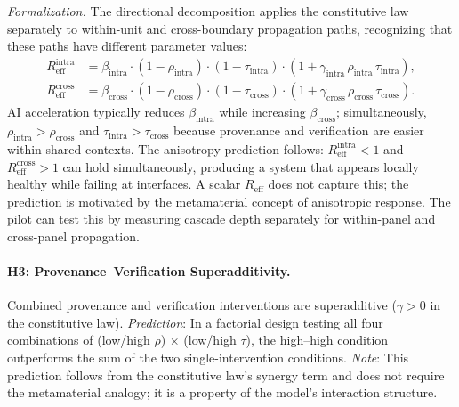 \documentclass[runningheads]{llncs}
\begin{document}
\emph{Formalization.} The directional decomposition applies the constitutive law separately to within-unit and cross-boundary propagation paths, recognizing that these paths have different parameter values:
\begin{align}
R_{\mathrm{eff}}^{\mathrm{intra}} &= \beta_{\mathrm{intra}} \cdot (1-\rho_{\mathrm{intra}}) \cdot (1-\tau_{\mathrm{intra}}) \cdot (1+\gamma_{\mathrm{intra}}\, \rho_{\mathrm{intra}}\, \tau_{\mathrm{intra}}), \label{eq:rintra} \\
R_{\mathrm{eff}}^{\mathrm{cross}} &= \beta_{\mathrm{cross}} \cdot (1-\rho_{\mathrm{cross}}) \cdot (1-\tau_{\mathrm{cross}}) \cdot (1+\gamma_{\mathrm{cross}}\, \rho_{\mathrm{cross}}\, \tau_{\mathrm{cross}}). \label{eq:rcross}
\end{align}
AI acceleration typically reduces $\beta_{\mathrm{intra}}$ while increasing $\beta_{\mathrm{cross}}$; simultaneously, $\rho_{\mathrm{intra}} > \rho_{\mathrm{cross}}$ and $\tau_{\mathrm{intra}} > \tau_{\mathrm{cross}}$ because provenance and verification are easier within shared contexts. The anisotropy prediction follows: $R_{\mathrm{eff}}^{\mathrm{intra}} < 1$ and $R_{\mathrm{eff}}^{\mathrm{cross}} > 1$ can hold simultaneously, producing a system that appears locally healthy while failing at interfaces. A scalar $R_{\mathrm{eff}}$ does not capture this; the prediction is motivated by the metamaterial concept of anisotropic response. The pilot can test this by measuring cascade depth separately for within-panel and cross-panel propagation.

\paragraph{H3: Provenance--Verification Superadditivity.}
Combined provenance and verification interventions are superadditive ($\gamma > 0$ in the constitutive law). \emph{Prediction}: In a factorial design testing all four combinations of (low/high $\rho$) $\times$ (low/high $\tau$), the high--high condition outperforms the sum of the two single-intervention conditions. \emph{Note}: This prediction follows from the constitutive law's synergy term and does not require the metamaterial analogy; it is a property of the model's interaction structure.

\end{document}
